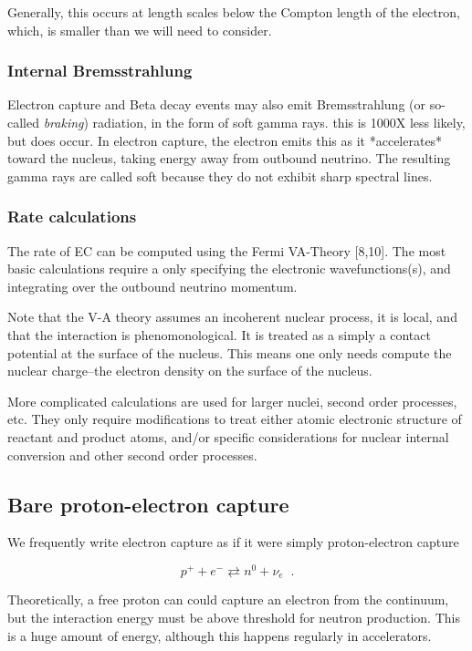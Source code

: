 \documentclass[11pt]{amsart}
\begin{document}
Generally, this occurs at length scales below the Compton length of the electron, which, is smaller than we will need to consider.

\subsubsection{Internal Bremsstrahlung}

Electron capture and Beta decay events may also emit Bremsstrahlung (or so-called \emph{braking}) radiation, in the form of soft gamma rays. this is 1000X less likely, but does occur.  In electron capture, the electron emits this as it *accelerates* toward the nucleus, taking energy away from outbound neutrino.  The resulting gamma rays are called soft because they do not exhibit sharp spectral lines.  

\subsubsection{Rate calculations}

The rate of EC can be computed using the Fermi VA-Theory [8,10].  The most basic calculations require a only specifying the electronic wavefunctions(s), and integrating over the outbound neutrino momentum.  

Note that the V-A theory assumes an incoherent nuclear process, it is local, and that the interaction is phenomonological. It is treated as a simply a contact potential at the surface of the nucleus. This means one only needs compute the nuclear charge--the electron density on the surface of the nucleus.

More complicated calculations are used for larger nuclei, second order processes, etc. They only require modifications to treat either atomic electronic structure of reactant and product atoms, and/or specific considerations for nuclear internal conversion and other second order processes.

\subsection{Bare proton-electron capture}


We frequently write electron capture as if it were simply proton-electron capture

$$p^{+}+e^{-} \rightleftarrows n^{0}+\nu_{e}\;\;.$$

Theoretically, a free proton can could capture an electron from the continuum, but the interaction energy must be  above threshold for neutron production.  This is a huge amount of energy, although this happens regularly in  accelerators.
\end{document}

